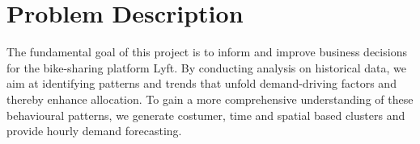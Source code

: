 \chapter{Problem Description}

The fundamental goal of this project is to inform and improve business decisions for the bike-sharing platform Lyft. By conducting analysis on historical data, we aim at identifying patterns and trends that unfold demand-driving factors and thereby enhance allocation. To gain a more comprehensive understanding of these behavioural patterns, we generate costumer, time and spatial based clusters and provide hourly demand forecasting.
